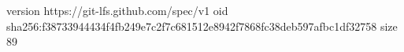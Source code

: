 version https://git-lfs.github.com/spec/v1
oid sha256:f38733944434f4fb249e7c2f7c681512e8942f7868fc38deb597afbc1df32758
size 89
